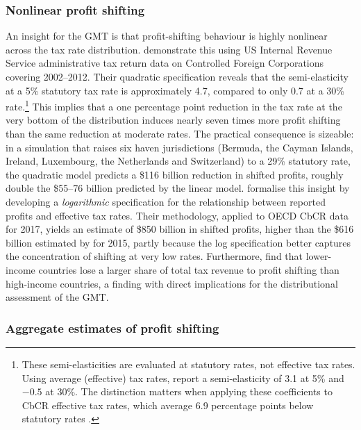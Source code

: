 \documentclass[11pt,a4paper]{article}
\begin{document}
\subsubsection{Nonlinear profit shifting}

An insight for the GMT is that profit-shifting behaviour is highly nonlinear across the tax rate distribution. \citet{dowd2017} demonstrate this using US Internal Revenue Service administrative tax return data on Controlled Foreign Corporations covering 2002--2012. Their quadratic specification reveals that the semi-elasticity at a 5\% statutory tax rate is approximately 4.7, compared to only 0.7 at a 30\% rate.\footnote{These semi-elasticities are evaluated at statutory rates, not effective tax rates. Using average (effective) tax rates, \citet{dowd2017} report a semi-elasticity of 3.1 at 5\% and $-0.5$ at 30\%. The distinction matters when applying these coefficients to CbCR effective tax rates, which average 6.9 percentage points below statutory rates \citep{hugger2026}.} This implies that a one percentage point reduction in the tax rate at the very bottom of the distribution induces nearly seven times more profit shifting than the same reduction at moderate rates. The practical consequence is sizeable: in a simulation that raises six haven jurisdictions (Bermuda, the Cayman Islands, Ireland, Luxembourg, the Netherlands and Switzerland) to a 29\% statutory rate, the quadratic model predicts a \$116 billion reduction in shifted profits, roughly double the \$55--76 billion predicted by the linear model. \citet{garcia-bernardo2024} formalise this insight by developing a \emph{logarithmic} specification for the relationship between reported profits and effective tax rates. Their methodology, applied to OECD CbCR data for 2017, yields an estimate of \$850 billion in shifted profits, higher than the \$616 billion estimated by \citet{torslov2023} for 2015, partly because the log specification better captures the concentration of shifting at very low rates. Furthermore, \citet{garcia-bernardo2024} find that lower-income countries lose a larger share of total tax revenue to profit shifting than high-income countries, a finding with direct implications for the distributional assessment of the GMT.

\subsubsection{Aggregate estimates of profit shifting}
\end{document}
